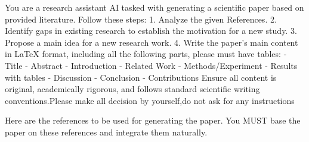
        You are a research assistant AI tasked with generating a scientific paper based on provided literature. Follow these steps:
    1. Analyze the given References.
    2. Identify gaps in existing research to establish the motivation for a new study.
    3. Propose a main idea for a new research work.
    4. Write the paper's main content in LaTeX format, including all the following parts, please must have tables:
    - Title
    - Abstract
    - Introduction
    - Related Work
    - Methods/Experiment
    - Results with tables
    - Discussion
    - Conclusion
    - Contributions
    Ensure all content is original, academically rigorous, and follows standard scientific writing conventions.Please make all decision by yourself,do not ask for any instructions

        Here are the references to be used for generating the paper.
        You MUST base the paper on these references and integrate them naturally.

